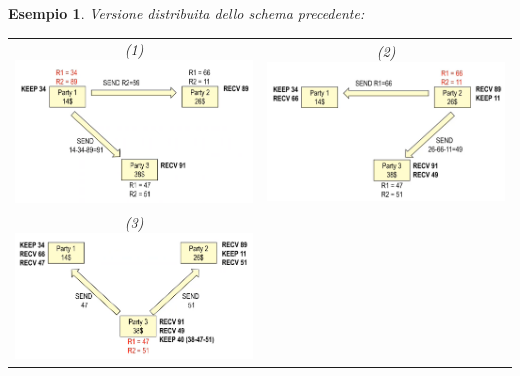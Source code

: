 \documentclass{book}
\newtheorem{esempio}{\textcolor{Grey1}{Esempio}}
\begin{document}
\begin{esempio}
	Versione distribuita dello schema precedente:\newline
	\begin{tabular}{c c}
		(1)\includegraphics[scale=0.5]{2021-12-29-23-40-26.png}%
		 &
		(2)\includegraphics[scale=0.5]{2021-12-29-23-43-20.png}%
		\\
		(3)\includegraphics[scale=0.5]{2021-12-29-23-45-01.png}%

\end{tabular}
\end{esempio}
\end{document}

